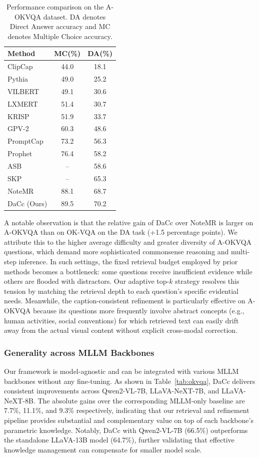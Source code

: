\documentclass[manuscript,screen,review]{acmart}
\begin{document}
\begin{table}[t]
\centering
\caption{Performance comparison on the A-OKVQA dataset. DA denotes Direct Answer accuracy and MC denotes Multiple Choice accuracy.}
\label{tab:aokvqa}
\begin{tabular}{l c c}
\hline
Method & MC(\%) & DA(\%) \\
\hline
ClipCap   & 44.0 & 18.1 \\
Pythia    & 49.0 & 25.2 \\
VILBERT   & 49.1 & 30.6 \\
LXMERT    & 51.4 & 30.7 \\
KRISP     & 51.9 & 33.7 \\
GPV-2     & 60.3 & 48.6 \\
PromptCap & 73.2 & 56.3 \\
Prophet   & 76.4 & 58.2 \\
ASB       & --   & 58.6 \\
SKP       & --   & 65.3 \\
NoteMR    & 88.1 & 68.7 \\
\hline
DaCc (Ours) & 89.5 & 70.2 \\
\hline
\end{tabular}
\end{table}

A notable observation is that the relative gain of DaCc over NoteMR is larger on A-OKVQA than on OK-VQA on the DA task (+1.5 percentage points). We attribute this to the higher average difficulty and greater diversity of A-OKVQA questions, which demand more sophisticated commonsense reasoning and multi-step inference. In such settings, the fixed retrieval budget employed by prior methods becomes a bottleneck: some questions receive insufficient evidence while others are flooded with distractors. Our adaptive top-$k$ strategy resolves this tension by matching the retrieval depth to each question's specific evidential needs. Meanwhile, the caption-consistent refinement is particularly effective on A-OKVQA because its questions more frequently involve abstract concepts (e.g., human activities, social conventions) for which retrieved text can easily drift away from the actual visual content without explicit cross-modal correction.

\subsubsection{Generality across MLLM Backbones}

Our framework is model-agnostic and can be integrated with various MLLM backbones without any fine-tuning. As shown in Table~\ref{tab:okvqa}, DaCc delivers consistent improvements across Qwen2-VL-7B, LLaVA-NeXT-7B, and LLaVA-NeXT-8B. The absolute gains over the corresponding MLLM-only baseline are 7.7\%, 11.1\%, and 9.3\% respectively, indicating that our retrieval and refinement pipeline provides substantial and complementary value on top of each backbone's parametric knowledge. Notably, DaCc with Qwen2-VL-7B (66.5\%) outperforms the standalone LLaVA-13B model (64.7\%), further validating that effective knowledge management can compensate for smaller model scale.
\end{document}
